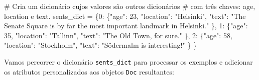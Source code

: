 \documentclass[
  brazilian,
  11pt,
]{article}
\newenvironment{Shaded}{\begin{snugshade}}{\end{snugshade}}
\newcommand{\CommentTok}[1]{\textcolor[rgb]{0.48,0.49,0.49}{#1}}
\newcommand{\DecValTok}[1]{\textcolor[rgb]{0.96,0.45,0.00}{#1}}
\newcommand{\NormalTok}[1]{\textcolor[rgb]{0.81,0.81,0.76}{#1}}
\newcommand{\OperatorTok}[1]{\textcolor[rgb]{0.81,0.81,0.76}{#1}}
\newcommand{\StringTok}[1]{\textcolor[rgb]{0.96,0.31,0.31}{#1}}
\let\oldtexttt\texttt
\renewcommand{\texttt}[1]{{\color{inlink}\oldtexttt{#1}}}
\begin{document}
\begin{Shaded}
\begin{Highlighting}[]
\CommentTok{\# Cria um dicionário cujos valores são outros dicionários}
\CommentTok{\# com três chaves: \textquotesingle{}age\textquotesingle{}, \textquotesingle{}location\textquotesingle{} e \textquotesingle{}text\textquotesingle{}.}
\NormalTok{sents\_dict }\OperatorTok{=}\NormalTok{ \{}\DecValTok{0}\NormalTok{: \{}\StringTok{"age"}\NormalTok{: }\DecValTok{23}\NormalTok{,}
                  \StringTok{"location"}\NormalTok{: }\StringTok{"Helsinki"}\NormalTok{,}
                  \StringTok{"text"}\NormalTok{: }\StringTok{"The Senate Square is by far the most important landmark in Helsinki."}
\NormalTok{                 \},}
              \DecValTok{1}\NormalTok{: \{}\StringTok{"age"}\NormalTok{: }\DecValTok{35}\NormalTok{,}
                  \StringTok{"location"}\NormalTok{: }\StringTok{"Tallinn"}\NormalTok{,}
                  \StringTok{"text"}\NormalTok{: }\StringTok{"The Old Town, for sure."}
\NormalTok{                 \},}
              \DecValTok{2}\NormalTok{: \{}\StringTok{"age"}\NormalTok{: }\DecValTok{58}\NormalTok{,}
                  \StringTok{"location"}\NormalTok{: }\StringTok{"Stockholm"}\NormalTok{,}
                  \StringTok{"text"}\NormalTok{: }\StringTok{"Södermalm is interesting!"}
\NormalTok{                 \}}
\NormalTok{             \}}
\end{Highlighting}
\end{Shaded}

Vamos percorrer o dicionário \texttt{sents\_dict} para processar os
exemplos e adicionar os atributos personalizados aos objetos
\texttt{Doc} resultantes:
\end{document}
